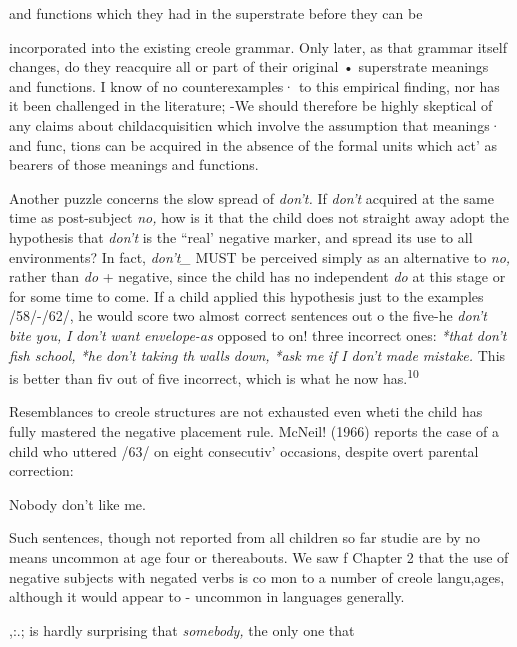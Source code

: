 and functions which they had in the superstrate before they can be

incorporated into the existing creole grammar. Only later, as that grammar itself changes, do they reacquire all or part of their original • superstrate meanings and functions. I know of no counterexamples· to this empirical finding, nor has it been challenged in the literature; {}-\-We should therefore be highly skeptical of any claims about child\-acquisiticn which involve the assumption that meanings· and func, tions can be acquired in the absence of the formal units which act' as bearers of those meanings and functions.

Another puzzle concerns the slow spread of \textit{don't.} If \textit{don't} acquired at the same time as post-subject \textit{no,} how is it that the child does not straight away adopt the hypothesis that \textit{don't }is the ``real' negative marker, and spread its use to all environments? In fact, \textit{don't\_} MUST be perceived simply as an alternative to \textit{no,} rather than \textit{do} + negative, since the child has no independent \textit{do} at this stage or for some time to come. If a child applied this hypothesis just to the exam\-ples /58/-/62/, he would score two almost correct sentences out o the five-he \textit{don't} \textit{bite} \textit{you,} \textit{I} \textit{don't} \textit{want} \textit{envelope-as} opposed to on! three incorrect ones: \textit{*that} \textit{don't} \textit{fish school, *he} \textit{don't taki}\textit{n}\textit{g} \textit{th} \textit{walls} \textit{down,} \textit{*ask} \textit{me} \textit{if} \textit{I} \textit{don't} \textit{made} \textit{mistake.} This is better than fiv out of five incorrect, which is what he now has.\textsuperscript{10}

Resemblances to creole structures are not exhausted even wheti the child has fully mastered the negative placement rule. McNeil! (1966) reports the case of a child who uttered /63/ on eight consecutiv' occasions, despite overt parental correction:

\ea\label{ex:63}
 Nobody don't like me.
\glt
\z

Such sentences, though not reported from all children so far studie are by no means uncommon at age four or thereabouts. We saw f Chapter 2 that the use of negative subjects with negated verbs is co mon to a number of creole langu,ages, although it would appear to {}- uncommon in languages generally.

,:.; is hardly surprising that \textit{somebo}\textit{d}\textit{y,} the only one that

